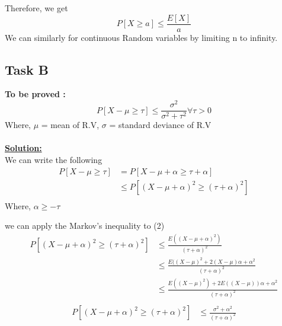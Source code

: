 \documentclass[12pt]{article}
\begin{document}
Therefore, we get
\begin{equation}
    P[X \geq a] \leq \frac{E[X]}{a}
\end{equation}
We can similarly for continuous Random variables by limiting n to infinity.

\subsection{Task B}
\textbf{To be proved :}
\begin{equation}
    P[X-\mu \geq \tau] \leq \frac{\sigma^2}{\sigma^2+\tau^2} \forall \tau > 0
\end{equation}
Where, $\mu$ = mean of R.V, $\sigma$ = standard deviance of R.V \\
\\
\textbf{\underline{Solution:}}\\
We can write the following
\begin{equation}
\begin{split}
    P[X-\mu \geq \tau]& = P[X-\mu+\alpha \geq \tau+\alpha] \\
    & \leq P[(X-\mu+\alpha)^2 \geq (\tau+\alpha)^2] \\
\end{split}
\end{equation}
Where, $\alpha \geq -\tau$

we can apply the Markov's inequality to (2)
\begin{equation}
\begin{split}
    P[(X-\mu+\alpha)^2 \geq (\tau+\alpha)^2]& \leq \frac{E((X-\mu+\alpha)^2)}{(\tau+\alpha)^2} \\
    & \leq \frac{E((X-\mu)^2+2(X-\mu)\alpha+\alpha^2}{(\tau+\alpha)^2} \\
    & \leq \frac{E((X-\mu)^2)+2E((X-\mu))\alpha+\alpha^2}{(\tau+\alpha)^2} \\
\end{split}
\end{equation}
\begin{equation}
\begin{split}
    P[(X-\mu+\alpha)^2 \geq (\tau+\alpha)^2]& \leq \frac{\sigma^2+\alpha^2}{(\tau+\alpha)^2}
\end{split}
\end{equation}
\end{document}
